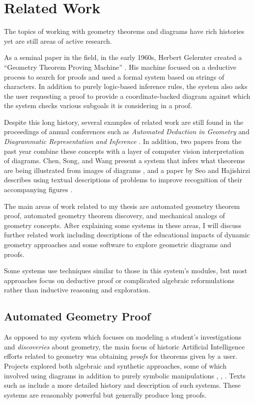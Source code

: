 \chapter{Related Work}
\label{chap:related-work}

The topics of working with geometry theorems and diagrams have rich
histories yet are still areas of active research.

As a seminal paper in the field, in the early 1960s, Herbert Gelernter
created a ``Geometry Theorem Proving Machine'' \cite{gelernter}. His
machine focused on a deductive process to search for proofs and used a
formal system based on strings of characters. In addition to purely
logic-based inference rules, the system also asks the user requesting
a proof to provide a coordinate-backed diagram against which the
system checks various subgoals it is considering in a proof.

Despite this long history, several examples of related work are still
found in the proceedings of annual conferences such as \emph{Automated
  Deduction in Geometry} \cite{autoDeduction} and \emph {Diagrammatic
  Representation and Inference} \cite{diagramInference}.  In addition,
two papers from the past year combine these concepts with a layer of
computer vision interpretation of diagrams.  Chen, Song, and Wang
present a system that infers what theorems are being illustrated from
images of diagrams \cite{fromImages}, and a paper by Seo and
Hajishirzi describes using textual descriptions of problems to improve
recognition of their accompanying figures \cite{diagramUnderstanding}.

The main areas of work related to my thesis are automated geometry
theorem proof, automated geometry theorem discovery, and mechanical
analogs of geometry concepts. After explaining some systems in these
areas, I will discuss further related work including descriptions of
the educational impacts of dynamic geometry approaches and some
software to explore geometric diagrams and proofs.

Some systems use techniques similar to those in this system's modules,
but most approaches focus on deductive proof or complicated algebraic
reformulations rather than inductive reasoning and exploration.

\section{Automated Geometry Proof}

As opposed to my system which focuses on modeling a student's
investigations and \emph{discoveries} about geometry, the main focus
of historic Artificial Intelligence efforts related to geometry was
obtaining \emph{proofs} for theorems given by a user. Projects
explored both algebraic and synthetic approaches, some of which
involved using diagrams in addition to purely symbolic manipulations
\cite{chou1988mechanical}, \cite{goldstein1973elementary},
\cite{nevins1975plane}. Texts such as \cite{jamnik2001mathematical}
include a more detailed history and description of such systems. These
systems are reasonably powerful but generally produce long proofs.

